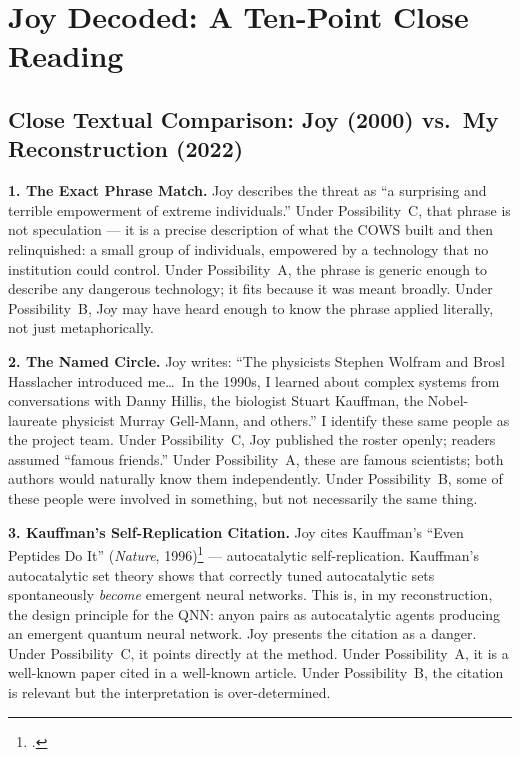 
\chapter{Joy Decoded: A Ten-Point Close Reading}
\label{app:joy-ten-point}

\section*{Close Textual Comparison: Joy (2000) vs.\ My Reconstruction (2022)}
\label{record:dep-close-textual-comparison-joy-2000-vs-my}

\textbf{1. The Exact Phrase Match.} Joy describes the threat as ``a surprising and terrible empowerment of extreme individuals.'' Under Possibility~C, that phrase is not speculation --- it is a precise description of what the COWS built and then relinquished: a small group of individuals, empowered by a technology that no institution could control. Under Possibility~A, the phrase is generic enough to describe any dangerous technology; it fits because it was meant broadly. Under Possibility~B, Joy may have heard enough to know the phrase applied literally, not just metaphorically.

\textbf{2. The Named Circle.} Joy writes: ``The physicists Stephen Wolfram and Brosl Hasslacher introduced me\ldots\ In the 1990s, I learned about complex systems from conversations with Danny Hillis, the biologist Stuart Kauffman, the Nobel-laureate physicist Murray Gell-Mann, and others.'' I identify these same people as the project team. Under Possibility~C, Joy published the roster openly; readers assumed ``famous friends.'' Under Possibility~A, these are famous scientists; both authors would naturally know them independently. Under Possibility~B, some of these people were involved in something, but not necessarily the same thing.%

\textbf{3. Kauffman's Self-Replication Citation.} Joy cites Kauffman's ``Even Peptides Do It'' (\textit{Nature}, 1996)\footcite{kauffman1996} --- autocatalytic self-replication. Kauffman's autocatalytic set theory shows that correctly tuned autocatalytic sets spontaneously \textit{become} emergent neural networks. This is, in my reconstruction, the design principle for the QNN: anyon pairs as autocatalytic agents producing an emergent quantum neural network. Joy presents the citation as a danger. Under Possibility~C, it points directly at the method. Under Possibility~A, it is a well-known paper cited in a well-known article. Under Possibility~B, the citation is relevant but the interpretation is over-determined.%

